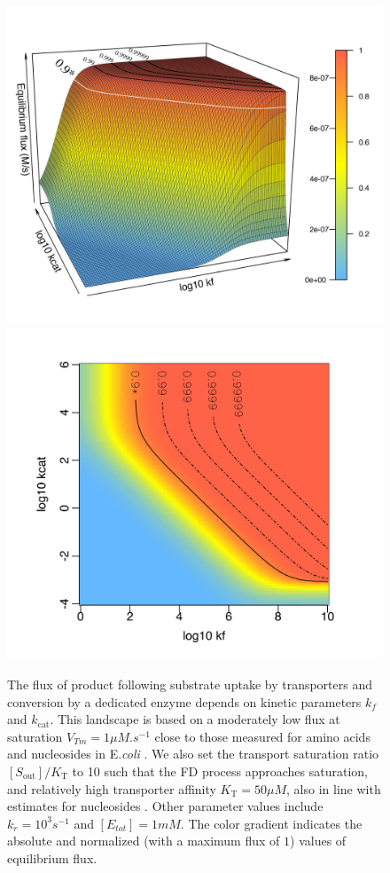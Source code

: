 \begin{figure}[t!]
\centering
\includegraphics[scale=0.55,trim=0cm 0.5cm 0 1cm,clip]{pics/Enzymes/3DFitLandscape.jpeg} 
\includegraphics[scale=0.55,trim=0 0cm 0cm 0.5cm,clip]{pics/Enzymes/2DFitLandscape.jpeg}  
\caption{The flux of product following substrate uptake by transporters and conversion by a dedicated enzyme depends on kinetic parameters $k_f$ and $k_\text{cat}$. This landscape is based on a moderately low flux at saturation $V_{Tm}=1 \mu M.s^{-1}$ close to those measured for amino acids and nucleosides in E.\textit{coli} \citep{Zampieri2019}. We also set the transport saturation ratio $[S_\text{out}]/K_\text{T}$ to 10 such that the FD process approaches saturation, and relatively high transporter affinity $K_\text{T}=50\mu M$, also in line with estimates for nucleosides \citep{Griffith96,Xie04}. Other parameter values include $k_r=10^3s^{-1}$ and $[E_{tot}]=1mM$. The color gradient indicates the absolute and normalized (with a maximum flux of $1$) values of equilibrium flux.
}
\label{figure3D2DFit}
\end{figure}

